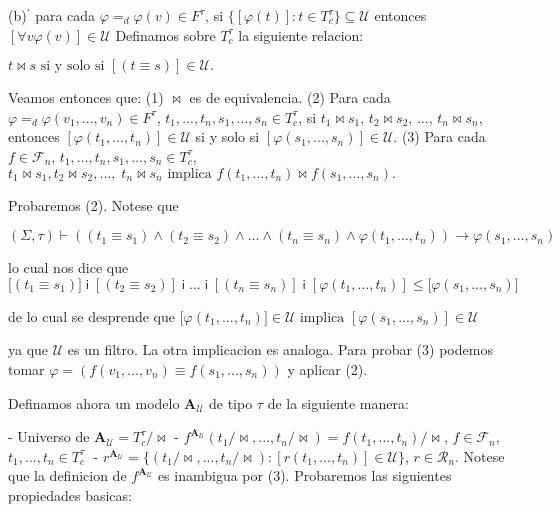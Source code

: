 (b)\(^{\prime }\) para cada \(\varphi =_{d}\varphi (v)\in F^{\tau }\), si \(\{[\varphi (t)]:t\in T_{c}^{\tau }\}\subseteq \mathcal{U}\) entonces \( [\forall v\varphi (v)]\in \mathcal{U}\)
Definamos sobre \(T_{c}^{\tau }\) la siguiente relacion:

\(\displaystyle t\bowtie s\text{ si y solo si }[(t\equiv s)]\in \mathcal{U}\text{.} \)

Veamos entonces que:
(1) \(\bowtie \) es de equivalencia.
(2) Para cada \(\varphi =_{d}\varphi (v_{1},...,v_{n})\in F^{\tau }\), \( t_{1},...,t_{n},s_{1},...,s_{n}\in T_{c}^{\tau }\), si \(t_{1}\bowtie s_{1}\), \( t_{2}\bowtie s_{2}\), \(...\), \(t_{n}\bowtie s_{n}\), entonces \([\varphi (t_{1},...,t_{n})]\in \mathcal{U}\) si y solo si \([\varphi (s_{1},...,s_{n})]\in \mathcal{U}\).
(3) Para cada \(f\in \mathcal{F}_{n}\), \( t_{1},...,t_{n},s_{1},...,s_{n}\in T_{c}^{\tau }\),
\(\displaystyle t_{1}\bowtie s_{1},t_{2}\bowtie s_{2},...,\;t_{n}\bowtie s_{n}\text{ implica }f(t_{1},...,t_{n})\bowtie f(s_{1},...,s_{n}). \)

Probaremos (2). Notese que

\(\displaystyle (\Sigma ,\tau )\vdash \left( (t_{1}\equiv s_{1})\wedge (t_{2}\equiv s_{2})\wedge ...\wedge (t_{n}\equiv s_{n})\wedge \varphi (t_{1},...,t_{n})\right) \rightarrow \varphi (s_{1},...,s_{n}) \)

lo cual nos dice que
\(\displaystyle \lbrack (t_{1}\equiv s_{1})]\;\mathsf{i\;}[(t_{2}\equiv s_{2})]\;\mathsf{i\;} ...\;\mathsf{i\;}[(t_{n}\equiv s_{n})]\;\mathsf{i\;}[\varphi (t_{1},...,t_{n})]\leq \lbrack \varphi (s_{1},...,s_{n})] \)

de lo cual se desprende que
\(\displaystyle \lbrack \varphi (t_{1},...,t_{n})]\in \mathcal{U}\text{ implica }[\varphi (s_{1},...,s_{n})]\in \mathcal{U} \)

ya que \(\mathcal{U}\) es un filtro. La otra implicacion es analoga.
Para probar (3) podemos tomar \(\varphi =\left( f(v_{1},...,v_{n})\equiv f(s_{1},...,s_{n})\right) \) y aplicar (2).

Definamos ahora un modelo \(\mathbf{A}_{\mathcal{U}}\) de tipo \(\tau \) de la siguiente manera:

- Universo de \(\mathbf{A}_{\mathcal{U}}=T_{c}^{\tau }/\mathrm{\bowtie }\)
- \(f^{\mathbf{A}_{\mathcal{U}}}(t_{1}/\mathrm{\bowtie },...,t_{n}/ \mathrm{\bowtie })=f(t_{1},...,t_{n})/\mathrm{\bowtie }\), \(f\in \mathcal{F} _{n}\), \(t_{1},...,t_{n}\in T_{c}^{\tau }\;\)
- \(r^{\mathbf{A}_{\mathcal{U}}}=\{(t_{1}/\mathrm{\bowtie },...,t_{n}/ \mathrm{\bowtie }):[r(t_{1},...,t_{n})]\in \mathcal{U}\}\), \(r\in \mathcal{R} _{n}.\)
Notese que la definicion de \(f^{\mathbf{A}_{\mathcal{U}}}\) es inambigua por (3). Probaremos las siguientes propiedades basicas:

